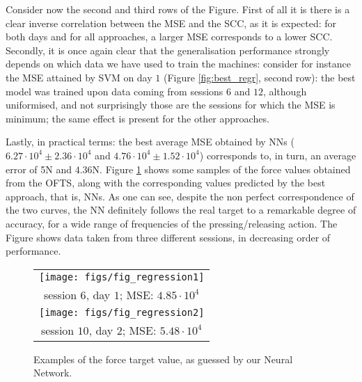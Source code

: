Consider now the second and third rows of the Figure. First of all
it is there is a clear inverse correlation between the MSE and the
SCC, as it is expected: for both days and for all approaches, a
larger MSE corresponds to a lower SCC. Secondly, it is once again
clear that the generalisation performance strongly depends on
which data we have used to train the machines: consider for
instance the MSE attained by SVM on day $1$ (Figure
\ref{fig:best_regr}, second row): the best model was trained upon
data coming from sessions $6$ and $12$, although uniformised, and
not surprisingly those are the sessions for which the MSE is
minimum; the same effect is present for the other approaches.

Lastly, in practical terms: the best average MSE obtained by NNs
($6.27\cdot 10^4 \pm 2.36\cdot 10^4$ and $4.76\cdot 10^4 \pm
1.52\cdot 10^4$) corresponds to, in turn, an average error of 5N
and $4.36$N. Figure \ref{fig:regression} shows some samples of the
force values obtained from the OFTS, along with the corresponding
values predicted by the best approach, that is, NNs. As one can
see, despite the non perfect correspondence of the two curves, the
NN definitely follows the real target to a remarkable degree of
accuracy, for a wide range of frequencies of the
pressing/releasing action. The Figure shows data taken from three
different sessions, in decreasing order of performance.

\begin{figure}\centering
  \begin{tabular}{c}
    \texttt{[image: figs/fig\_regression1]}\\
    session $6$, day $1$; MSE: $4.85\cdot 10^4$\\
    \texttt{[image: figs/fig\_regression2]}\\
    session $10$, day $2$; MSE: $5.48\cdot 10^4$
  \end{tabular}
  \caption{Examples of the force target value, as guessed by our
    Neural Network.}
  \label{fig:regression}
\end{figure}
